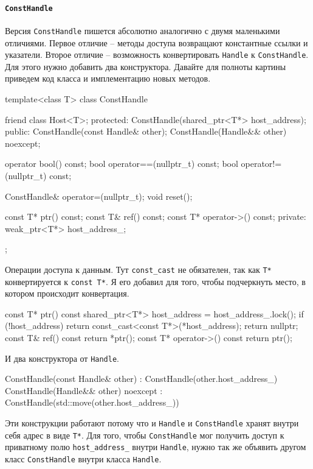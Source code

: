 \paragraph{\texttt{ConstHandle}}

Версия \verb"ConstHandle" пишется абсолютно аналогично с двумя маленькими отличиями.
Первое отличие -- методы доступа возвращают константные ссылки и указатели.
Второе отличие -- возможность конвертировать \verb"Handle" к \verb"ConstHandle".
Для этого нужно добавить два конструктора.
Давайте для полноты картины приведем код класса и имплементацию новых методов.
\begin{cppcode}
template<class T>
class ConstHandle {
  friend class Host<T>;
protected:
  ConstHandle(shared_ptr<T*> host_address);
public:
  ConstHandle(const Handle& other);
  ConstHandle(Handle&& other) noexcept;

  operator bool() const;
  bool operator==(nullptr_t) const;
  bool operator!=(nullptr_t) const;

  ConstHandle& operator=(nullptr_t);
  void reset();

  const T* ptr() const;
  const T& ref() const;
  const T* operator->() const;
private:
  weak_ptr<T*> host_address_;
};
\end{cppcode}
Операции доступа к данным.
Тут \verb"const_cast" не обязателен, так как \verb"T*" конвертируется к \verb"const T*".
Я его добавил для того, чтобы подчеркнуть место, в котором происходит конвертация.
\begin{cppcode}
const T* ptr() const {
  shared_ptr<T*> host_address = host_address_.lock();
  if (!host_address)
    return const_cast<const T*>(*host_address);
  return nullptr;
}
const T& ref() const {
  return *ptr();
}
const T* operator->() const {
  return ptr();
}
\end{cppcode}
И два конструктора от \verb"Handle".
\begin{cppcode}
ConstHandle(const Handle& other) : ConstHandle(other.host_address_) {
}
ConstHandle(Handle&& other) noexcept : ConstHandle(std::move(other.host_address_)) {
}
\end{cppcode}
Эти конструкции работают потому что и \verb"Handle" и \verb"ConstHandle" хранят внутри себя адрес в виде \verb"T*".
Для того, чтобы \verb"ConstHandle" мог получить доступ к приватному полю \verb"host_address_" внутри \verb"Handle", нужно так же объявить другом класс \verb"ConstHandle" внутри класса \verb"Handle".
